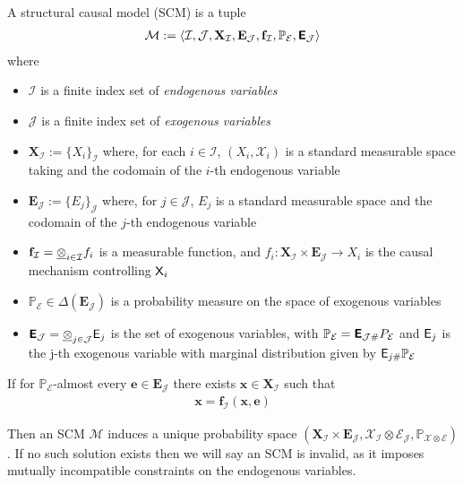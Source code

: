 \begin{definition}\label{def:SCM}
	A structural causal model (SCM) is a tuple 
	\begin{align}
		\mathcal{M}:=\langle \mathcal{I},\mathcal{J},\mathbf{X}_{\mathcal{I}},\mathbf{E}_{\mathcal{J}},\mathbf{f}_{\mathcal{I}},\mathbb{P}_{\mathcal{E}},\bm{\mathsf{E}}_{\mathcal{J}}\rangle
	\end{align}
	where 
	\begin{itemize}
		\item $\mathcal{I}$ is a finite index set of \emph{endogenous variables}
		\item $\mathcal{J}$ is a finite index set of \emph{exogenous variables}
		\item $\mathbf{X}_{\mathcal{I}}:=\{X_i\}_{\mathcal{I}}$ where, for each $i\in \mathcal{I}$, $(X_i,\mathcal{X}_i)$ is a standard measurable space taking and the codomain of the $i$-th endogenous variable
		\item $\mathbf{E}_{\mathcal{J}}:=\{E_j\}_{\mathcal{J}}$ where, for $j\in \mathcal{J}$, $E_j$ is a standard measurable space and the codomain of the $j$-th endogenous variable
		\item $\mathbf{f}_{\mathcal{I}}=\underline{\otimes}_{i\in\mathcal{I}} f_i$ is a measurable function, and $f_i:\mathbf{X}_{\mathcal{I}}\times\mathbf{E}_{\mathcal{J}}\to X_i$ is the causal mechanism controlling $\mathsf{X}_i$
		\item $\mathbb{P}_{\mathcal{E}}\in \Delta(\mathbf{E}_{\mathcal{J}})$ is a probability measure on the space of exogenous variables
		\item $\bm{\mathsf{E}}_{\mathcal{J}}=\underline{\otimes}_{j\in\mathcal{J}} \mathsf{E}_j$ is the set of exogenous variables, with $\mathbb{P}_{\mathcal{E}}=\bm{\mathsf{E}}_{\mathcal{J}\#}P_{\mathcal{E}}$ and $\mathsf{E}_j$ is the j-th exogenous variable with marginal distribution given by $\mathsf{E}_{j\#}\mathbb{P}_{\mathcal{E}}$
	\end{itemize}
\end{definition}

If for $\mathbb{P}_{\mathcal{E}}$-almost every $\mathbf{e}\in\mathbf{E}_{\mathcal{J}}$ there exists $\mathbf{x}\in\mathbf{X}_{\mathcal{I}}$ such that
\begin{align}
	\mathbf{x} = \mathbf{f}_{\mathcal{I}}(\mathbf{x},\mathbf{e})
\end{align}

Then an SCM $\mathcal{M}$ induces a unique probability space $(\mathbf{X}_{\mathcal{I}}\times\mathbf{E}_{\mathcal{J}},\mathcal{X}_{\mathcal{I}}\otimes\mathcal{E}_{\mathcal{J}},\mathbb{P}_{\mathcal{X}\otimes\mathcal{E}})$ \citep{bongers_theoretical_2016}. If no such solution exists then we will say an SCM is invalid, as it imposes mutually incompatible constraints on the endogenous variables.

